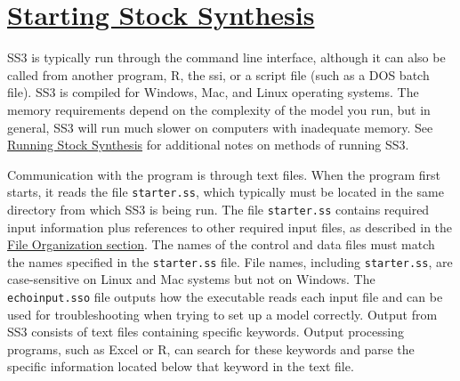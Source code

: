 \pagebreak

\hypertarget{StartingSS3}{}
\section[Starting Stock Synthesis]{\protect\hyperlink{StartingSS3}{Starting Stock Synthesis}}
SS3 is typically run through the command line interface, although it can also be called from another program, R, the \gls{ssi}, or a script file (such as a DOS batch file). SS3 is compiled for Windows, Mac, and Linux operating systems. The memory requirements depend on the complexity of the model you run, but in general, SS3 will run much slower on computers with inadequate memory. See \hyperref[sec:RunningSS3]{Running Stock Synthesis} for additional notes on methods of running SS3.

Communication with the program is through text files. When the program first starts, it reads the file \texttt{starter.ss}, which typically must be located in the same directory from which SS3 is being run. The file \texttt{starter.ss} contains required input information plus references to other required input files, as described in the \hyperref[FileOrganization]{File Organization section}. The names of the control and data files must match the names specified in the \texttt{starter.ss} file. File names, including \texttt{starter.ss}, are case-sensitive on Linux and Mac systems but not on Windows. The \texttt{echoinput.sso} file outputs how the executable reads each input file and can be used for troubleshooting when trying to set up a model correctly. Output from SS3 consists of text files containing specific keywords. Output processing programs, such as Excel or R, can search for these keywords and parse the specific information located below that keyword in the text file.

\pagebreak
